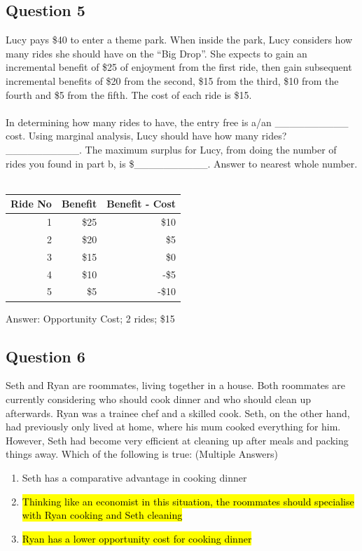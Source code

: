 \subsection{Question 5}
Lucy pays \$40 to enter a theme park. When inside the park, Lucy considers how many rides she should have on the ``Big Drop''. She expects to gain an incremental benefit of \$25 of enjoyment from the first ride, then gain subsequent incremental benefits of \$20 from the second, \$15 from the third, \$10 from the fourth and \$5 from the fifth. The cost of each ride is \$15.\\\\
In determining how many rides to have, the entry free is a/an \_\_\_\_\_\_\_\_\_\_ cost. Using marginal analysis, Lucy should have how many rides? \_\_\_\_\_\_\_\_\_\_. The maximum surplus for Lucy, from doing the number of rides you found in part b, is \$\_\_\_\_\_\_\_\_\_\_. Answer to nearest whole number.\\\\
\begin{table}[H]
	\centering
	\begin{tabular}{rrr}
		Ride No & Benefit & Benefit - Cost\\\hline
		1 & \$25 & \$10\\
		2 & \$20 & \$5\\
		3 & \$15 & \$0\\
		4 & \$10 & -\$5\\
		5 & \$5 & -\$10
	\end{tabular}
\end{table}
Answer: Opportunity Cost; 2 rides; \$15

\subsection{Question 6}
Seth and Ryan are roommates, living together in a house. Both roommates are currently considering who should cook dinner and who should clean up afterwards. Ryan was a trainee chef and a skilled cook. Seth, on the other hand, had previously only lived at home, where his mum cooked everything for him. However, Seth had become very efficient at cleaning up after meals and packing things away. Which of the following is true: (Multiple Answers)
\begin{enumerate}
	\item Seth has a comparative advantage in cooking dinner
	\item \hl{Thinking like an economist in this situation, the roommates should specialise with Ryan cooking and Seth cleaning}
	\item \hl{Ryan has a lower opportunity cost for cooking dinner}
\end{enumerate}

